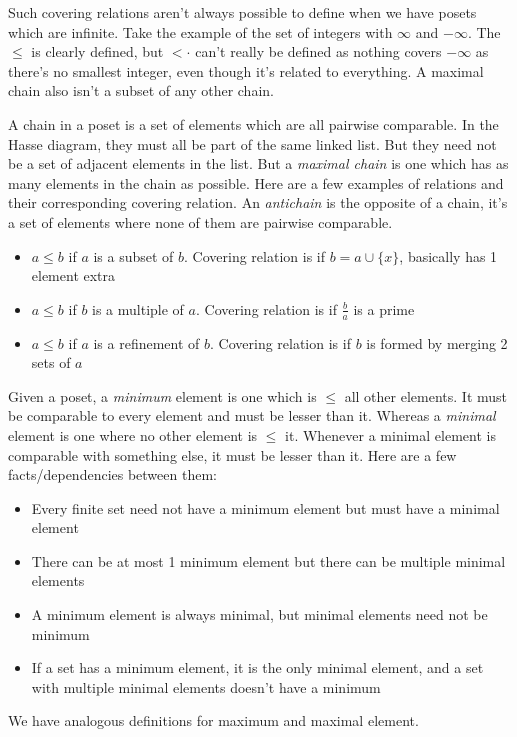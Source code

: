 \documentclass[a4paper,10pt]{article}
\theoremstyle{definition} %
\begin{document}
    Such covering relations aren't always possible to define when we have posets which are infinite. Take the example of the set of integers with $\infty$
    and $-\infty$. The $\leq$ is clearly defined, but $<\cdot$ can't really be defined as nothing covers $-\infty$ as there's no smallest integer, 
    even though it's related to everything. A maximal chain also isn't a subset of any other chain.

    A chain in a poset is a set of elements which are all pairwise comparable. In the Hasse diagram, they must all be part of the same linked list. But they 
    need not be a set of adjacent elements in the list. But a \emph{maximal chain} is one which has as many elements in the chain as possible.  
    Here are a few examples of relations and their corresponding covering relation. An \emph{antichain} is the opposite of a chain, it's a set of elements where
    none of them are pairwise comparable.
    \begin{itemize}
        \item $a \leq b$ if $a$ is a subset of $b$. Covering relation is if $b = a \cup \{x\}$, basically has 1 element extra
        \item $a \leq b$ if $b$ is a multiple of $a$. Covering relation is if $\frac{b}{a}$ is a prime
        \item $a \leq b$ if $a$ is a refinement of $b$. Covering relation is if $b$ is formed by merging 2 sets of $a$
    \end{itemize}

    Given a poset, a \emph{minimum} element is one which is $\leq$ all other elements. It must be comparable to every element and must be lesser than it.
    Whereas a \emph{minimal} element is one where no other element is $\leq$ it. Whenever a minimal element is comparable with something else, it must be
    lesser than it. Here are a few facts/dependencies between them:
    \begin{itemize}
        \item Every finite set need not have a minimum element but must have a minimal element
        \item There can be at most 1 minimum element but there can be multiple minimal elements 
        \item A minimum element is always minimal, but minimal elements need not be minimum
        \item If a set has a minimum element, it is the only minimal element, and a set with multiple minimal elements doesn't have a minimum
    \end{itemize}
    We have analogous definitions for maximum and maximal element.
\end{document}
